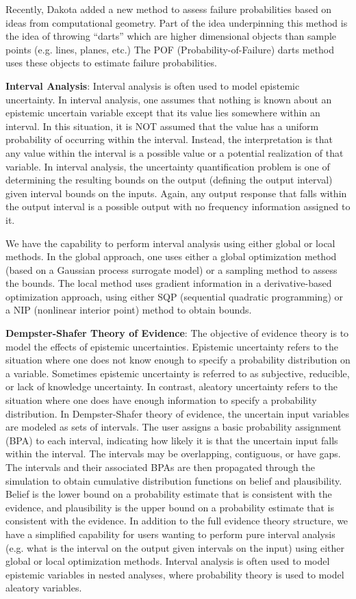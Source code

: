 Recently, Dakota added a new method to assess failure probabilities 
based on ideas from computational geometry.  Part of the idea
underpinning this method is the idea of throwing ``darts'' which 
are higher dimensional objects than sample points (e.g. lines, planes, etc.) 
The POF (Probability-of-Failure) darts method uses these objects 
to estimate failure probabilities. 
 
\textbf{Interval Analysis}: Interval analysis is often used to model 
epistemic uncertainty. In interval analysis, one assumes that nothing 
is known about an epistemic uncertain variable except that its value lies 
somewhere within an interval. In this situation, it is NOT 
assumed that the value has a uniform probability of occurring 
within the interval. Instead, the interpretation is that 
any value within the interval is a possible value or a potential 
realization of that variable. In interval analysis, the 
uncertainty quantification problem is one of determining the 
resulting bounds on the output (defining the output interval) 
given interval bounds on the inputs. Again, any output response 
that falls within the output interval is a possible output 
with no frequency information assigned to it.

We have the capability to perform interval analysis using either
global or local methods. In the global approach, one uses either a 
global optimization method (based on a Gaussian process surrogate model)
or a sampling method to assess the bounds. The
local method uses gradient information in a derivative-based 
optimization approach, using either SQP (sequential quadratic 
programming) or a NIP (nonlinear interior point) method to obtain bounds. 
 
\textbf{Dempster-Shafer Theory of Evidence}: The objective of evidence
theory is to model the effects of epistemic uncertainties. Epistemic
uncertainty refers to the situation where one does not know enough
to specify a probability distribution on a variable. Sometimes epistemic
uncertainty is referred to as subjective, reducible, or lack of knowledge
uncertainty. In contrast, aleatory uncertainty refers to the situation
where one does have enough information to specify a probability distribution.
In Dempster-Shafer theory of evidence, the uncertain input variables
are modeled as sets of intervals. The user assigns a basic probability
assignment (BPA) to each interval, indicating how likely it is that the
uncertain input falls within the interval. The intervals may be
overlapping, contiguous, or have gaps. The intervals and their associated
BPAs are then propagated through the simulation to obtain cumulative
distribution functions on belief and plausibility. Belief is the lower
bound on a probability estimate that is consistent with the evidence, and
plausibility is the upper bound on a probability estimate that is consistent
with the evidence. In addition to the full evidence theory structure, 
we have a simplified capability for users wanting to perform pure 
interval analysis (e.g. what is the interval on the output given 
intervals on the input) using either global or local optimization methods. 
Interval analysis is often used to model epistemic variables in 
nested analyses, where probability theory is used to model aleatory variables.

